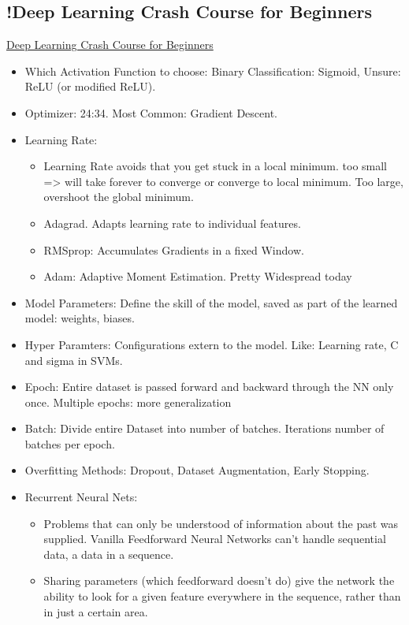 \subsection{!Deep Learning Crash Course for Beginners}
\href{https://www.youtube.com/watch?v=VyWAvY2CF9c}{Deep Learning Crash Course for Beginners}
\begin{itemize}[noitemsep,nolistsep]
	\item Which Activation Function to choose: Binary Classification: Sigmoid, Unsure: ReLU (or modified ReLU).
	\item Optimizer: 24:34. Most Common: Gradient Descent.
	\item Learning Rate:
	\begin{itemize}[noitemsep,nolistsep]
		\item Learning Rate avoids that you get stuck in a local minimum. too small => will take forever to converge or converge to local minimum. Too large, overshoot the global minimum.
		\item Adagrad. Adapts learning rate to individual features.
		\item RMSprop: Accumulates Gradients in a fixed Window.
		\item Adam: Adaptive Moment Estimation. Pretty Widespread today
	\end{itemize}
	\item Model Parameters: Define the skill of the model, saved as part of the learned model: weights, biases.
	\item Hyper Paramters: Configurations extern to the model. Like: Learning rate, C and sigma in SVMs.
	\item Epoch: Entire dataset is passed forward and backward through the NN only once. Multiple epochs: more generalization
	\item Batch: Divide entire Dataset into number of batches. Iterations number of batches per epoch.
	\item Overfitting Methods: Dropout, Dataset Augmentation, Early Stopping.
	\item Recurrent Neural Nets:
	\begin{itemize}[noitemsep,nolistsep]
		\item Problems that can only be understood of information about the past was supplied. Vanilla Feedforward Neural Networks can't handle sequential data, a data in a sequence. 
		\item Sharing parameters (which feedforward doesn't do) give the network the ability to look for a given feature everywhere in the sequence, rather than in just a certain area.

\end{itemize}
\end{itemize}
